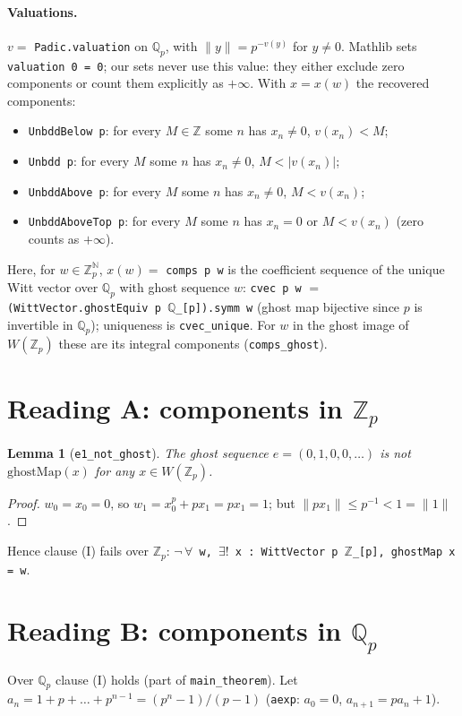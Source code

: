 \documentclass[11pt]{article}
\newtheorem{lemma}[theorem]{Lemma}
\theoremstyle{definition}
\newcommand{\Zp}{\mathbb{Z}_p}
\newcommand{\Qp}{\mathbb{Q}_p}
\newcommand{\lean}[1]{\texttt{#1}}
\begin{document}
\paragraph{Valuations.} $v=$ \lean{Padic.valuation} on $\Qp$, with $\|y\|=p^{-v(y)}$ for $y\ne0$.
Mathlib sets \lean{valuation 0 = 0}; our sets never use this value: they either exclude zero
components or count them explicitly as $+\infty$. With $x=x(w)$ the recovered components:
\begin{itemize}
\item \lean{UnbddBelow p}: for every $M\in\mathbb Z$ some $n$ has $x_n\neq0$, $v(x_n)<M$;
\item \lean{Unbdd p}: for every $M$ some $n$ has $x_n\ne0$, $M<|v(x_n)|$;
\item \lean{UnbddAbove p}: for every $M$ some $n$ has $x_n\ne0$, $M<v(x_n)$;
\item \lean{UnbddAboveTop p}: for every $M$ some $n$ has $x_n=0$ or $M<v(x_n)$ (zero counts as $+\infty$).
\end{itemize}
Here, for $w\in\Zp^{\mathbb N}$, $x(w)=$ \lean{comps p w} is the coefficient sequence of the unique Witt
vector over $\Qp$ with ghost sequence $w$: \lean{cvec p w} $=$
\lean{(WittVector.ghostEquiv p $\mathbb Q$\_[p]).symm w} (ghost map bijective since $p$ is invertible in
$\Qp$); uniqueness is \lean{cvec\_unique}. For $w$ in the ghost image of $W(\Zp)$ these are its integral
components (\lean{comps\_ghost}).

\section{Reading A: components in $\Zp$}

\begin{lemma}[\lean{e1\_not\_ghost}]
The ghost sequence $e=(0,1,0,0,\dots)$ is not $\mathrm{ghostMap}(x)$ for any $x\in W(\Zp)$.
\end{lemma}
\begin{proof}
$w_0=x_0=0$, so $w_1=x_0^p+p x_1=p x_1=1$; but $\|p x_1\|\le p^{-1}<1=\|1\|$.
\end{proof}
Hence clause (I) fails over $\Zp$: \lean{$\neg\,\forall$ w, $\exists!$ x : WittVector p $\mathbb Z$\_[p], ghostMap x = w}.

\section{Reading B: components in $\Qp$}

Over $\Qp$ clause (I) holds (part of \lean{main\_theorem}). Let $a_n=1+p+\dots+p^{n-1}=(p^n-1)/(p-1)$
(\lean{aexp}: $a_0=0$, $a_{n+1}=p a_n+1$).
\end{document}
